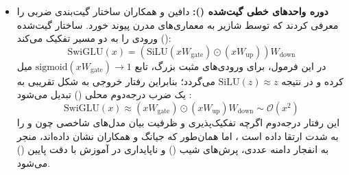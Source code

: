 \begin{itemize}
    \item \textbf{دوره واحدهای خطی گیت‌شده ():} دافین و همکاران \cite{dauphin2017language} ساختار گیت‌بندی ضربی را معرفی کردند که توسط شازیر \cite{shazeer2020glu} به معماری‌های مدرن پیوند خورد. ساختار گیت‌شده () ورودی را به دو مسیر تفکیک می‌کند:
    \begin{equation}
        \text{SwiGLU}(x) = \left( \text{SiLU}(x W_{\text{gate}}) \odot (x W_{\text{up}}) \right) W_{\text{down}}
    \end{equation}
    در این فرمول، برای ورودی‌های مثبت بزرگ، تابع $\text{sigmoid}(x W_{\text{gate}}) \to 1$ میل کرده و در نتیجه $\text{SiLU}(z) \approx z$ می‌گردد؛ بنابراین رفتار خروجی به شکل تقریبی به یک ضرب درجه‌دوم محلی () تبدیل می‌شود \cite{jiang2026powlu}:
    \begin{equation}
        \text{SwiGLU}(x) \approx (x W_{\text{gate}}) \odot (x W_{\text{up}}) W_{\text{down}} \sim \mathcal{O}(x^2)
    \end{equation}
    این رفتار درجه‌دوم اگرچه تفکیک‌پذیری و ظرفیت بیان مدل‌های شاخصی چون  و  را به شدت ارتقا داده است \cite{touvron2023llama, yang2025qwen3}، اما همان‌طور که جیانگ و همکاران \cite{jiang2026powlu} نشان داده‌اند، منجر به انفجار دامنه عددی، پرش‌های شیب () و ناپایداری در آموزش با دقت پایین () می‌شود.
\end{itemize}


